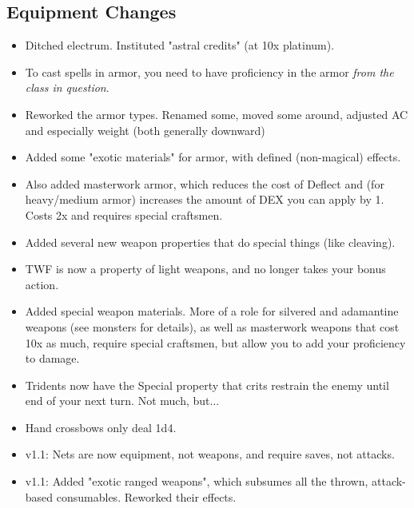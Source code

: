 \subsection*{Equipment Changes}
\begin{itemize}
    \item Ditched electrum. Instituted "astral credits" (at 10x platinum).
    \item To cast spells in armor, you need to have proficiency in the armor \textit{from the class in question}.
    \item Reworked the armor types. Renamed some, moved some around, adjusted AC and especially weight (both generally downward)
    \item Added some "exotic materials" for armor, with defined (non-magical) effects.
    \item Also added masterwork armor, which reduces the cost of Deflect and (for heavy/medium armor) increases the amount of DEX you can apply by 1. Costs 2x and requires special craftsmen.
    \item Added several new weapon properties that do special things (like cleaving).
    \item TWF is now a property of light weapons, and no longer takes your bonus action.
    \item Added special weapon materials. More of a role for silvered and adamantine weapons (see monsters for details), as well as masterwork weapons that cost 10x as much, require special craftsmen, but allow you to add your proficiency to damage.
    \item Tridents now have the Special property that crits restrain the enemy until end of your next turn. Not much, but$\dots$
    \item Hand crossbows only deal 1d4.
    \item v1.1: Nets are now equipment, not weapons, and require saves, not attacks.
    \item v1.1: Added "exotic ranged weapons", which subsumes all the thrown, attack-based consumables. Reworked their effects.
\end{itemize}
